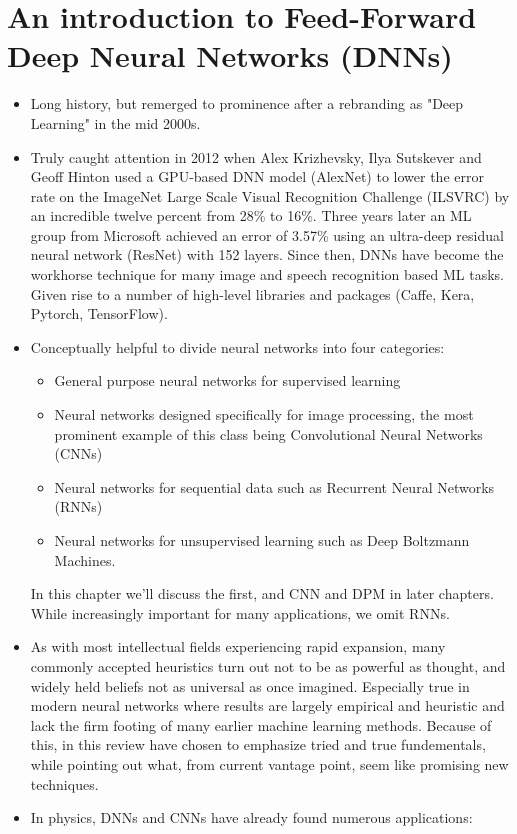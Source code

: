 \documentclass[norsk,a4paper,11pt]{article}
\begin{document}
\section{An introduction to Feed-Forward Deep Neural Networks (DNNs)}
\begin{itemize}
	\item Long history, but remerged to prominence after a rebranding as "Deep Learning" in the mid 2000s.
	\item Truly caught attention in 2012 when Alex Krizhevsky, Ilya Sutskever and Geoff Hinton used a GPU-based DNN model (AlexNet) to lower the error rate on the ImageNet Large Scale Visual Recognition Challenge (ILSVRC) by an incredible twelve percent from 28\% to 16\%. Three years later an ML group from Microsoft achieved an error of 3.57\% using an ultra-deep residual neural network (ResNet) with 152 layers. Since then, DNNs have become the workhorse technique for many image and speech recognition based ML tasks. Given rise to a number of high-level libraries and packages (Caffe, Kera, Pytorch, TensorFlow).
	\item Conceptually helpful to divide neural networks into four categories:
	\begin{itemize}
		\item General purpose neural networks for supervised learning
		\item Neural networks designed specifically for image processing, the most prominent example of this class being Convolutional Neural Networks (CNNs)
		\item Neural networks for sequential data such as Recurrent Neural Networks (RNNs) 
		\item Neural networks for unsupervised learning such as Deep Boltzmann Machines.
	\end{itemize}
	In this chapter we'll discuss the first, and CNN and DPM in later chapters. While increasingly important for many applications, we omit RNNs.
	\item As with most intellectual fields experiencing rapid expansion, many commonly accepted heuristics turn out not to be as powerful as thought, and widely held beliefs not as universal as once imagined. Especially true in modern neural networks where results are largely empirical and heuristic and lack the firm footing of many earlier machine learning methods. Because of this, in this review have chosen to emphasize tried and true fundementals, while pointing out what, from current vantage point, seem like promising new techniques. 
	\item In physics, DNNs and CNNs have already found numerous applications:

\end{itemize}
\end{document}
